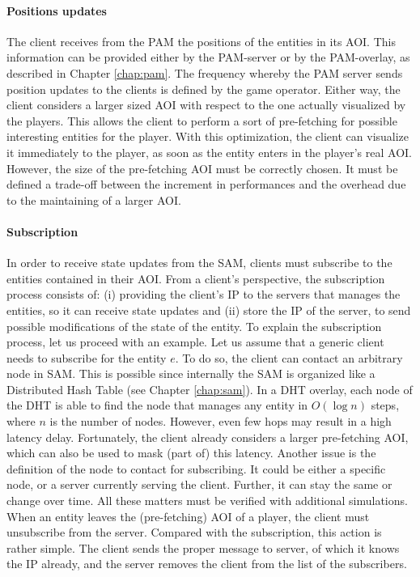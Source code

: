 \documentclass[final,10pt,a5paper]{phdimt}
\theoremstyle{definition}
\begin{document}
\paragraph{Positions updates}
The client receives from the PAM the positions of the entities in its AOI.
This information can be provided either by the PAM-server or by the PAM-overlay, as described in Chapter \ref{chap:pam}.
The frequency whereby the PAM server sends position updates to the clients is defined by the game operator.
Either way, the client considers a larger sized AOI with respect to the one actually visualized by the players.
This allows the client to perform a sort of pre-fetching for possible interesting entities for the player.
With this optimization, the client can visualize it immediately to the player, as soon as the entity enters in the player's real AOI.
However, the size of the pre-fetching AOI must be correctly chosen.
It must be defined a trade-off between the increment in performances and the overhead due to the maintaining of a larger AOI.


\paragraph{Subscription}
In order to receive state updates from the SAM, clients must subscribe to the entities contained in their AOI.
From a client's perspective, the subscription process consists of: (i) providing the client's IP to the servers that manages the entities, so it can receive state updates and (ii) store the IP of the server, to send possible modifications of the state of the entity.
To explain the subscription process, let us proceed with an example.
Let us assume that a generic client needs to subscribe for the entity $e$.
To do so, the client can contact an arbitrary node in SAM.
This is possible since internally the SAM is organized like a Distributed Hash Table (see Chapter \ref{chap:sam}). 
In a DHT overlay, each node of the DHT is able to find the node that manages any entity in $O(\log n)$ steps, where $n$ is the number of nodes. However, even few hops may result in a high latency delay.
Fortunately, the client already considers a larger pre-fetching AOI, which can also be used to mask (part of) this latency.
Another issue is the definition of the node to contact for subscribing.
It could be either a specific node, or a server currently serving the client.
Further, it can stay the same or change over time. All these matters must be verified with additional simulations.
When an entity leaves the (pre-fetching) AOI of a player, the client must unsubscribe from the server.
Compared with the subscription, this action is rather simple. The client sends the proper message to server, of which it knows the IP already, and the server removes the client from the list of the subscribers.
\end{document}
